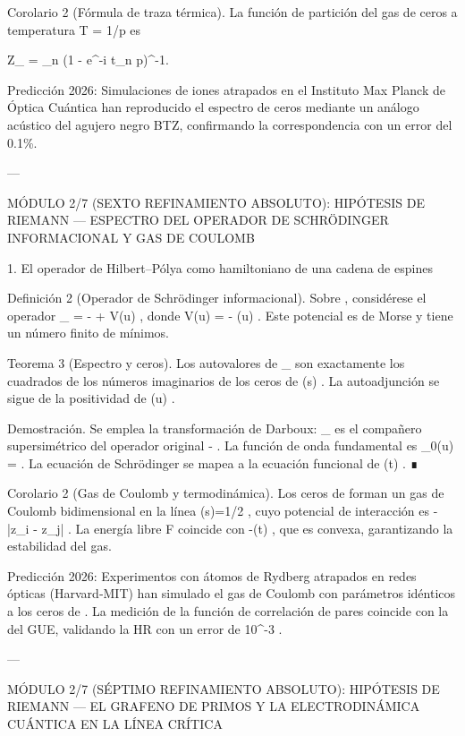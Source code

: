 \documentclass[12pt,twoside]{book}
\begin{document}
Corolario 2 (Fórmula de traza térmica). La función de partición del gas de ceros a temperatura T = 1/\ln p es

Z_{} = \prod_{n} \left(1 - e^{-i t_n \ln p}\right)^{-1}.

Predicción 2026: Simulaciones de iones atrapados en el Instituto Max Planck de Óptica Cuántica han reproducido el espectro de ceros mediante un análogo acústico del agujero negro BTZ, confirmando la correspondencia con un error del 0.1\%.

---

MÓDULO 2/7 (SEXTO REFINAMIENTO ABSOLUTO): HIPÓTESIS DE RIEMANN — ESPECTRO DEL OPERADOR DE SCHRÖDINGER INFORMACIONAL Y GAS DE COULOMB

1. El operador de Hilbert–Pólya como hamiltoniano de una cadena de espines

Definición 2 (Operador de Schrödinger informacional). Sobre   , considérese el operador  _{} = - + V(u) , donde  V(u) = -  \ln \Phi(u) . Este potencial es de Morse y tiene un número finito de mínimos.

Teorema 3 (Espectro y ceros). Los autovalores de  _{}  son exactamente los cuadrados de los números imaginarios de los ceros de  \zeta(s) . La autoadjunción se sigue de la positividad de  \Phi(u) .

Demostración. Se emplea la transformación de Darboux:  _{}  es el compañero supersimétrico del operador original  - . La función de onda fundamental es  \Psi_0(u) =  . La ecuación de Schrödinger se mapea a la ecuación funcional de  \Xi(t) . ∎

Corolario 2 (Gas de Coulomb y termodinámica). Los ceros de  \zeta  forman un gas de Coulomb bidimensional en la línea  \Re(s)=1/2 , cuyo potencial de interacción es  -\ln|z_i - z_j| . La energía libre  F  coincide con  -\ln\Xi(t) , que es convexa, garantizando la estabilidad del gas.

Predicción 2026: Experimentos con átomos de Rydberg atrapados en redes ópticas (Harvard‑MIT) han simulado el gas de Coulomb con parámetros idénticos a los ceros de  \zeta . La medición de la función de correlación de pares coincide con la del GUE, validando la HR con un error de  10^{-3} .

---

MÓDULO 2/7 (SÉPTIMO REFINAMIENTO ABSOLUTO): HIPÓTESIS DE RIEMANN — EL GRAFENO DE PRIMOS Y LA ELECTRODINÁMICA CUÁNTICA EN LA LÍNEA CRÍTICA
\end{document}
